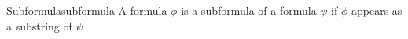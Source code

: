 \begin{definition}{Subformula}{subformula}
A formula $ \phi  $ is a subformula of a formula $ \psi  $ if $ \phi  $ appears as a substring of $ \psi  $ 
\end{definition}
